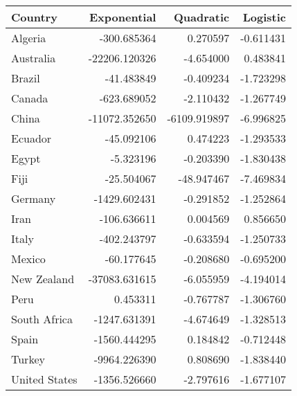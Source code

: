 \begin{tabular}{lrrr}
\toprule
       Country &   Exponential &    Quadratic &  Logistic \\
\midrule
       Algeria &   -300.685364 &     0.270597 & -0.611431 \\
     Australia & -22206.120326 &    -4.654000 &  0.483841 \\
        Brazil &    -41.483849 &    -0.409234 & -1.723298 \\
        Canada &   -623.689052 &    -2.110432 & -1.267749 \\
         China & -11072.352650 & -6109.919897 & -6.996825 \\
       Ecuador &    -45.092106 &     0.474223 & -1.293533 \\
         Egypt &     -5.323196 &    -0.203390 & -1.830438 \\
          Fiji &    -25.504067 &   -48.947467 & -7.469834 \\
       Germany &  -1429.602431 &    -0.291852 & -1.252864 \\
          Iran &   -106.636611 &     0.004569 &  0.856650 \\
         Italy &   -402.243797 &    -0.633594 & -1.250733 \\
        Mexico &    -60.177645 &    -0.208680 & -0.695200 \\
   New Zealand & -37083.631615 &    -6.055959 & -4.194014 \\
          Peru &      0.453311 &    -0.767787 & -1.306760 \\
  South Africa &  -1247.631391 &    -4.674649 & -1.328513 \\
         Spain &  -1560.444295 &     0.184842 & -0.712448 \\
        Turkey &  -9964.226390 &     0.808690 & -1.838440 \\
 United States &  -1356.526660 &    -2.797616 & -1.677107 \\
\bottomrule
\end{tabular}
